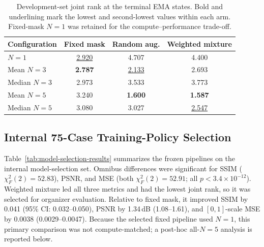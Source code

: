 \documentclass[runningheads]{llncs}
\begin{document}
\begin{table}[t]
  \centering
  \caption{Development-set joint rank at the terminal EMA states. Bold and underlining mark the lowest and second-lowest values within each arm. Fixed-mask $N=1$ was retained for the compute--performance trade-off.}
  \label{tab:ensemble-selection}
  \small
  \setlength{\tabcolsep}{8pt}
  \begin{tabularx}{\textwidth}{@{}Xccc@{}}
    \toprule
    Configuration & Fixed mask & Random aug. & Weighted mixture \\
    \midrule
    $N=1$ & \underline{2.920} & 4.707 & 4.400 \\
    Mean $N=3$ & \textbf{2.787} & \underline{2.133} & 2.693 \\
    Median $N=3$ & 2.973 & 3.533 & 3.773 \\
    Mean $N=5$ & 3.240 & \textbf{1.600} & \textbf{1.587} \\
    Median $N=5$ & 3.080 & 3.027 & \underline{2.547} \\
    \bottomrule
  \end{tabularx}
\end{table}

\subsection{Internal 75-Case Training-Policy Selection} \label{sec:results:confirmation}

Table~\ref{tab:model-selection-results} summarizes the frozen pipelines on the internal model-selection set. Omnibus differences were significant for SSIM ($\chi_F^2(2)=52.83$), PSNR, and MSE (both $\chi_F^2(2)=52.91$; all $p<3.4\times10^{-12}$). Weighted mixture led all three metrics and had the lowest joint rank, so it was selected for organizer evaluation. Relative to fixed mask, it improved SSIM by 0.041 (95\% CI: 0.032--0.050), PSNR by 1.34\,dB (1.08--1.61), and $[0,1]$-scale MSE by 0.0038 (0.0029--0.0047). Because the selected fixed pipeline used $N=1$, this primary comparison was not compute-matched; a post-hoc all-$N=5$ analysis is reported below.
\end{document}
